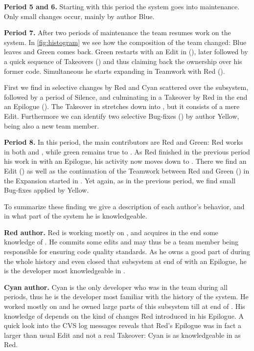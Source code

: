 \textbf{Period 5 and 6.} Starting with this period the system goes into maintenance. Only small changes occur, mainly by author Blue.

\textbf{Period 7.} After two periods of maintenance the team resumes work on the system. In \autoref{fig:histogram} we see how the composition of the team changed: Blue leaves and Green comes back. Green restarts with an Edit in  (), later followed by a quick sequence of Takeovers () and thus claiming back the ownership over his former code. Simultaneous he starts expanding  in Teamwork with Red ().

First we find in  selective changes by Red and Cyan scattered over the subsystem, followed by a period of Silence, and culminating in a Takeover by Red in the end \ie an Epilogue (). The Takeover in  stretches down into , but it consists of a mere Edit. Furthermore we can identify two selective Bug-fixes () by author Yellow, being also a new team member.

\textbf{Period 8.} In this period, the main contributors are Red and Green: Red works in both  and , while green remains true to . As Red finished in the previous period his work in  with an Epilogue, his activity now moves down to . There we find an Edit () as well as the continuation of the Teamwork between Red and Green () in the Expansion started in . Yet again, as in the previous period, we find small Bug-fixes applied by Yellow.

To summarize these finding we give a description of each author's behavior, and in what part of the system he is knowledgeable.

\textbf{Red author.} Red is working mostly on , and acquires in the end some knowledge of . He commits some edits and may thus be a team member being responsible for ensuring code quality standards. As he owns a good part of  during the whole history and even closed that subsystem at end of  with an Epilogue, he is the developer most knowledgeable in .

\textbf{Cyan author.} Cyan is the only developer who was in the team during all periods, thus he is the developer most familiar with the history of the system. He worked mostly on  and he owned large parts of this subsystem till at end of . His knowledge of  depends on the kind of changes Red introduced in his Epilogue. A quick look into the CVS log messages reveals that Red's Epilogue was in fact a larger than usual Edit and not a real Takeover: Cyan is as knowledgeable in  as Red.

